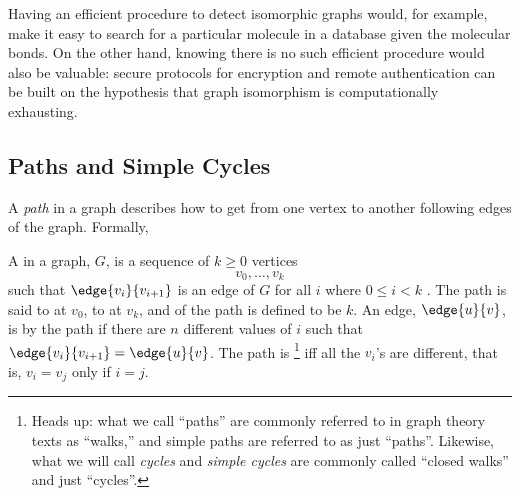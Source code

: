 Having an efficient procedure to detect isomorphic graphs would, for
example, make it easy to search for a particular molecule in a database
given the molecular bonds.  On the other hand, knowing there is no such
efficient procedure would also be valuable: secure protocols for
encryption and remote authentication can be built on the hypothesis that
graph isomorphism is computationally exhausting.

\begin{problems}
\classproblems
{}

\homeworkproblems
{}
\end{problems}



\subsection{Paths and Simple Cycles}

A \emph{path} in a graph describes how to get from one vertex to another
following edges of the graph.  Formally,

\begin{definition}
A  in a graph, $G$, is a sequence of $k \geq 0$ vertices
\[
v_0,\dots,v_k
\]
such that $\edge{v_i}{v_{i+1}}$ is an edge of $G$ for all $i$ where $0
\leq i < k$ .  The path is said to  at $v_0$, to  at
$v_k$, and  of the path is defined to be $k$.  An edge,
$\edge{u}{v}$, is  by the path if there are $n$
different values of $i$ such that $\edge{v_i}{v_{i+1}} = \edge{u}{v}$.
The path is \footnote{Heads up: what we call ``paths'' are
  commonly referred to in graph theory texts as
  ``walks,'' and simple paths are referred to as just ``paths''.
  Likewise, what we will call \emph{cycles} and \emph{simple cycles}
  are commonly called ``closed walks'' and just ``cycles''.}  iff all
the $v_i$'s are different, that is, $v_i = v_j$ only if $i=j$.

\end{definition}


